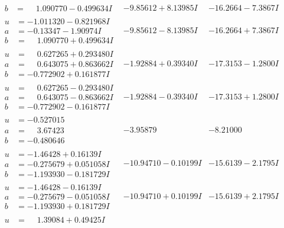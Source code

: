 \documentclass[1p]{elsarticle_modified}
\theoremstyle{definition}
\begin{document}
$$\begin{array}{c|c|c}
\begin{aligned}
b &= \phantom{-}1.090770 - 0.499634 I\end{aligned}
 & -9.85612 + 8.13985 I & -16.2664 - 7.3867 I \\ \hline\begin{aligned}
u &= -1.011320 - 0.821968 I \\
a &= -0.13347 - 1.90974 I \\
b &= \phantom{-}1.090770 + 0.499634 I\end{aligned}
 & -9.85612 - 8.13985 I & -16.2664 + 7.3867 I \\ \hline\begin{aligned}
u &= \phantom{-}0.627265 + 0.293480 I \\
a &= \phantom{-}0.643075 + 0.863662 I \\
b &= -0.772902 + 0.161877 I\end{aligned}
 & -1.92884 + 0.39340 I & -17.3153 - 1.2800 I \\ \hline\begin{aligned}
u &= \phantom{-}0.627265 - 0.293480 I \\
a &= \phantom{-}0.643075 - 0.863662 I \\
b &= -0.772902 - 0.161877 I\end{aligned}
 & -1.92884 - 0.39340 I & -17.3153 + 1.2800 I \\ \hline\begin{aligned}
u &= -0.527015\phantom{ +0.000000I} \\
a &= \phantom{-}3.67423\phantom{ +0.000000I} \\
b &= -0.480646\phantom{ +0.000000I}\end{aligned}
 & -3.95879\phantom{ +0.000000I} & -8.21000\phantom{ +0.000000I} \\ \hline\begin{aligned}
u &= -1.46428 + 0.16139 I \\
a &= -0.275679 + 0.051058 I \\
b &= -1.193930 - 0.181729 I\end{aligned}
 & -10.94710 - 0.10199 I & -15.6139 - 2.1795 I \\ \hline\begin{aligned}
u &= -1.46428 - 0.16139 I \\
a &= -0.275679 - 0.051058 I \\
b &= -1.193930 + 0.181729 I\end{aligned}
 & -10.94710 + 0.10199 I & -15.6139 + 2.1795 I \\ \hline\begin{aligned}
u &= \phantom{-}1.39084 + 0.49425 I \\

\end{aligned}
\end{array}$$
\end{document}
